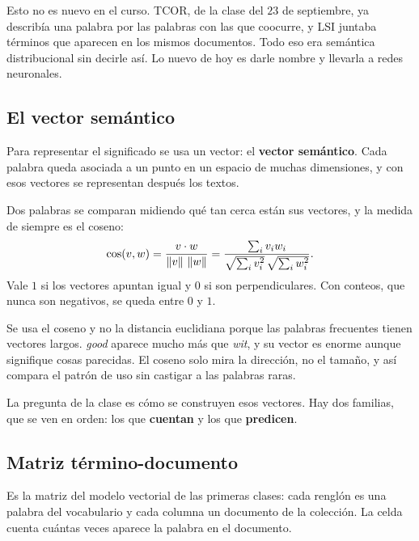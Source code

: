 \documentclass[11pt,letterpaper]{article}
\begin{document}
\begin{idea}
    Esto no es nuevo en el curso. TCOR, de la clase del $23$ de
    septiembre, ya describía una palabra por las palabras con las que
    coocurre, y LSI juntaba términos que aparecen en los mismos
    documentos. Todo eso era semántica distribucional sin decirle así.
    Lo nuevo de hoy es darle nombre y llevarla a redes neuronales.
\end{idea}


\subsection*{El vector semántico}

Para representar el significado se usa un vector: el
\textbf{vector semántico}. Cada palabra queda asociada a un punto en
un espacio de muchas dimensiones, y con esos vectores se representan
después los textos.

Dos palabras se comparan midiendo qué tan cerca están sus vectores, y
la medida de siempre es el coseno:
\[
    \cos(v, w) = \frac{v \cdot w}{\left\lVert v \right\rVert\,\left\lVert w \right\rVert}
               = \frac{\sum_i v_i w_i}{\sqrt{\sum_i v_i^2}\,
                                        \sqrt{\sum_i w_i^2}} .
\]
Vale $1$ si los vectores apuntan igual y $0$ si son perpendiculares.
Con conteos, que nunca son negativos, se queda entre $0$ y $1$.

\begin{ojo}
    Se usa el coseno y no la distancia euclidiana porque las palabras
    frecuentes tienen vectores largos. \textit{good} aparece mucho más
    que \textit{wit}, y su vector es enorme aunque signifique cosas
    parecidas. El coseno solo mira la dirección, no el tamaño, y así
    compara el patrón de uso sin castigar a las palabras raras.
\end{ojo}

La pregunta de la clase es cómo se construyen esos vectores. Hay dos
familias, que se ven en orden: los que \textbf{cuentan} y los que
\textbf{predicen}.


\subsection*{Matriz término-documento}

Es la matriz del modelo vectorial de las primeras clases: cada renglón
es una palabra del vocabulario y cada columna un documento de la
colección. La celda cuenta cuántas veces aparece la palabra en el
documento.
\end{document}
